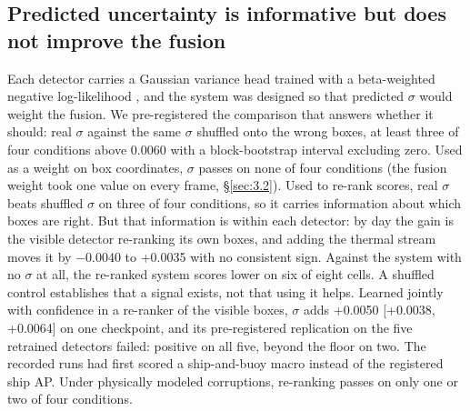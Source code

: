 \documentclass[10pt]{article}
\begin{document}
\subsection{Predicted uncertainty is informative but does not improve the fusion}\label{sec:6.1}
Each detector carries a Gaussian variance head \citep{choi2019gaussian} trained with a beta-weighted negative log-likelihood \citep{seitzer2022on}, and the system was designed so that predicted $\sigma$ would weight the fusion. We pre-registered the comparison that answers whether it should: real $\sigma$ against the same $\sigma$ shuffled onto the wrong boxes, at least three of four conditions above 0.0060 with a block-bootstrap interval excluding zero. Used as a weight on box coordinates, $\sigma$ passes on none of four conditions (the fusion weight took one value on every frame, \S\ref{sec:3.2}). Used to re-rank scores, real $\sigma$ beats shuffled $\sigma$ on three of four conditions, so it carries information about which boxes are right. But that information is within each detector: by day the gain is the visible detector re-ranking its own boxes, and adding the thermal stream moves it by $-$0.0040 to +0.0035 with no consistent sign. Against the system with no $\sigma$ at all, the re-ranked system scores lower on six of eight cells. A shuffled control establishes that a signal exists, not that using it helps. Learned jointly with confidence in a re-ranker of the visible boxes, $\sigma$ adds +0.0050 [+0.0038, +0.0064] on one checkpoint, and its pre-registered replication on the five retrained detectors failed: positive on all five, beyond the floor on two. The recorded runs had first scored a ship-and-buoy macro instead of the registered ship AP. Under physically modeled corruptions, re-ranking passes on only one or two of four conditions.
\end{document}
